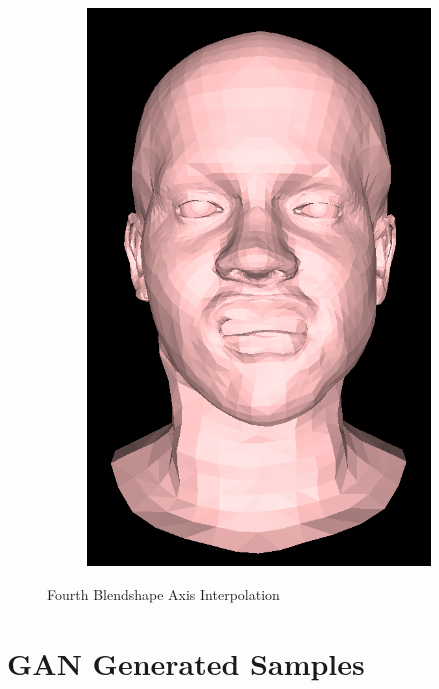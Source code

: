 \begin{figure}[h]
\begin{subfigure}[b]{0.24\textwidth}
        \includegraphics[width=\textwidth]{figures/blendshape_interp/4/00004.png}
    \end{subfigure}
    \caption{Fourth Blendshape Axis Interpolation}\label{fig:Blendshape_axis_4}
\end{figure}

\newpage
\section*{GAN Generated Samples}

